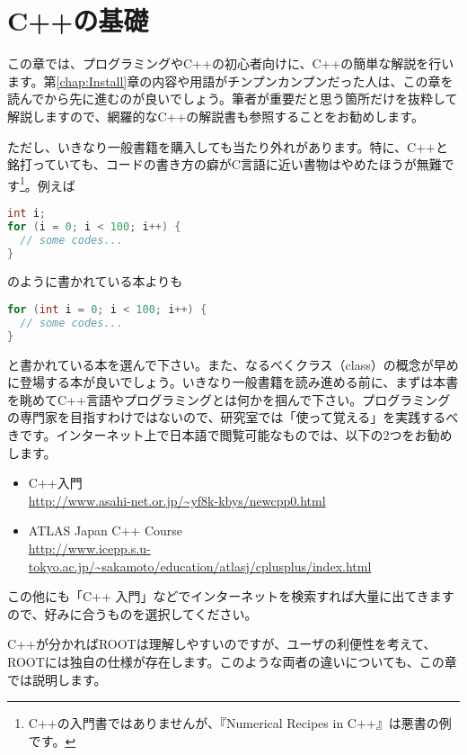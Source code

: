 \chapter{C++の基礎}
\label{chap:C++}

この章では、プログラミングやC++の初心者向けに、C++の簡単な解説を行います。第\ref{chap:Install}章の内容や用語がチンプンカンプンだった人は、この章を読んでから先に進むのが良いでしょう。筆者が重要だと思う箇所だけを抜粋して解説しますので、網羅的なC++の解説書も参照することをお勧めします。

ただし、いきなり一般書籍を購入しても当たり外れがあります。特に、C++と銘打っていても、コードの書き方の癖がC言語に近い書物はやめたほうが無難です\footnote{C++の入門書ではありませんが、『Numerical Recipes in C++』は悪書の例です。}。例えば
\begin{lstlisting}[language=c++]
int i;
for (i = 0; i < 100; i++) {
  // some codes...
}
\end{lstlisting}
のように書かれている本よりも
\begin{lstlisting}[language=c++]
for (int i = 0; i < 100; i++) {
  // some codes...
}
\end{lstlisting}
と書かれている本を選んで下さい。また、なるべくクラス（class）の概念が早めに登場する本が良いでしょう。いきなり一般書籍を読み進める前に、まずは本書を眺めてC++言語やプログラミングとは何かを掴んで下さい。プログラミングの専門家を目指すわけではないので、研究室では「使って覚える」を実践するべきです。インターネット上で日本語で閲覧可能なものでは、以下の2つをお勧めします。
\begin{itemize}
\item C++入門\\
\url{http://www.asahi-net.or.jp/~yf8k-kbys/newcpp0.html}
\item ATLAS Japan C++ Course\\
\url{http://www.icepp.s.u-tokyo.ac.jp/~sakamoto/education/atlasj/cplusplus/index.html}
\end{itemize}
この他にも「C++ 入門」などでインターネットを検索すれば大量に出てきますので、好みに合うものを選択してください。

C++が分かればROOTは理解しやすいのですが、ユーザの利便性を考えて、ROOTには独自の仕様が存在します。このような両者の違いについても、この章では説明します。 
\clearpage
